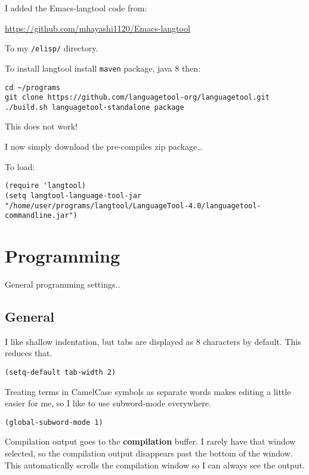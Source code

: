 \documentclass[12pt]{article}
\begin{document}
I added the Emacs-langtool code from:

\url{https://github.com/mhayashi1120/Emacs-langtool}

To my \texttt{/elisp/} directory. 

To install langtool install \texttt{maven} package, java 8 then:

\begin{verbatim}
cd ~/programs
git clone https://github.com/languagetool-org/languagetool.git
./build.sh languagetool-standalone package

\end{verbatim}
This does not work! 

I now simply download the pre-compiles zip package\ldots{} 

To load: 
\lstset{language=Lisp,label= ,caption= ,captionpos=b,numbers=none}
\begin{lstlisting}
(require 'langtool)
(setq langtool-language-tool-jar "/home/user/programs/langtool/LanguageTool-4.0/languagetool-commandline.jar")
\end{lstlisting}

\section{Programming}
\label{sec:org81b7648}

General programming settings..

\subsection{General}
\label{sec:orgdef21ad}

I like shallow indentation, but tabs are displayed as 8 characters by default. This reduces that.

\lstset{language=Lisp,label= ,caption= ,captionpos=b,numbers=none}
\begin{lstlisting}
(setq-default tab-width 2)
\end{lstlisting}

Treating terms in CamelCase symbols as separate words makes editing a little
easier for me, so I like to use subword-mode everywhere.
\lstset{language=Lisp,label= ,caption= ,captionpos=b,numbers=none}
\begin{lstlisting}
(global-subword-mode 1)
\end{lstlisting}

Compilation output goes to the \textbf{compilation} buffer. I rarely have that window
selected, so the compilation output disappears past the bottom of the window.
This automatically scrolls the compilation window so I can always see the
output.
\end{document}
